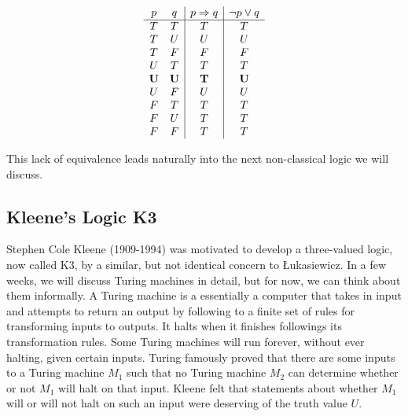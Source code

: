 \documentclass[11pt]{article}
\theoremstyle{definition}
\theoremstyle{remark}
\begin{document}
\noindent
\[
\begin{array}{c c|c|c}
p & q & p \Rightarrow q & \neg p \vee q \\
\hline
T & T & T & T\\
T & U & U & U \\
T & F & F & F\\
U & T & T & T\\
\textbf{U} & \textbf{U} & \textbf{T} & \textbf{U}\\
U & F & U & U\\
F & T & T & T\\
F & U & T & T\\
F & F & T & T \\
\end{array}
\]\par
\noindent
This lack of equivalence leads naturally into the next non-classical logic we will discuss.

\subsection{Kleene's Logic K3}
Stephen Cole Kleene (1909-1994) was motivated to develop a three-valued logic, now called K3, by a similar, but not identical concern to Łukasiewicz. In a few weeks, we will discuss Turing machines in detail, but for now, we can think about them informally. A Turing machine is a essentially a computer that takes in input and attempts to return an output by following to a finite set of rules for transforming inputs to outputs. It halts when it finishes followings its transformation rules. Some Turing machines will run forever, without ever halting, given certain inputs. Turing famously proved that there are some inputs to a Turing machine $M_{1}$ such that no Turing machine $M_{2}$ can determine whether or not $M_{1}$ will halt on that input. Kleene felt that statements about whether $M_{1}$ will or will not halt on such an input were deserving of the truth value $U$.\par
\end{document}
